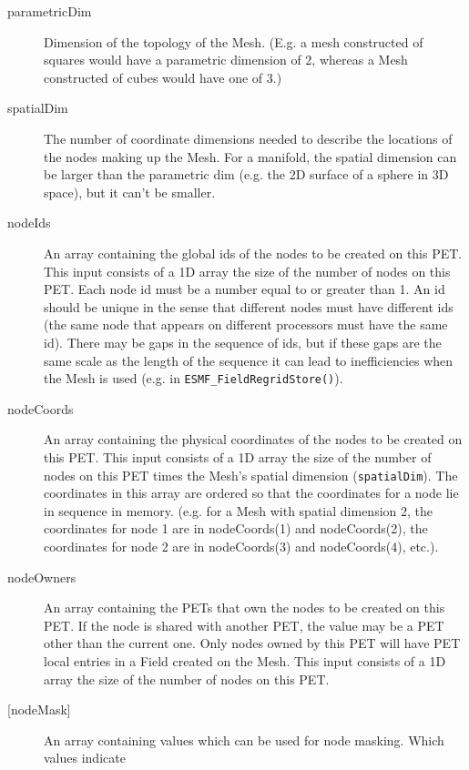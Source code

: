      \begin{description}
     \item [parametricDim]
           Dimension of the topology of the Mesh. (E.g. a mesh constructed of squares would
           have a parametric dimension of 2, whereas a Mesh constructed of cubes would have one
           of 3.)
     \item[spatialDim]
           The number of coordinate dimensions needed to describe the locations of the nodes
           making up the Mesh. For a manifold, the spatial dimension can be larger than the
           parametric dim (e.g. the 2D surface of a sphere in 3D space), but it can't be smaller.
     \item [nodeIds]
           An array containing the global ids of the nodes to be created on this PET.
           This input consists of a 1D array the size of the number of nodes on this PET.
            Each node id must be a number equal to or greater than 1. An id should be
            unique in the sense that different nodes must have different ids (the same node
            that appears on different processors must have the same id). There may be gaps in the sequence
            of ids, but if these gaps are the same scale as the length of the sequence it can lead to
            inefficiencies when the Mesh is used (e.g. in {\tt ESMF\_FieldRegridStore()}).
     \item[nodeCoords]
            An array containing the physical coordinates of the nodes to be created on this
            PET. This input consists of a 1D array the size of the number of nodes on this PET times the Mesh's
            spatial dimension ({\tt spatialDim}). The coordinates in this array are ordered
            so that the coordinates for a node lie in sequence in memory. (e.g. for a
            Mesh with spatial dimension 2, the coordinates for node 1 are in nodeCoords(1) and
            nodeCoords(2), the coordinates for node 2 are in nodeCoords(3) and nodeCoords(4),
            etc.).
     \item[nodeOwners]
           An array containing the PETs that own the nodes to be created on this PET.
           If the node is shared with another PET, the value
           may be a PET other than the current one. Only nodes owned by this PET
           will have PET local entries in a Field created on the Mesh. This input consists of
           a 1D array the size of the number of nodes on this PET.
     \item [{[nodeMask]}]
            An array containing values which can be used for node masking. Which values indicate

\end{description}

